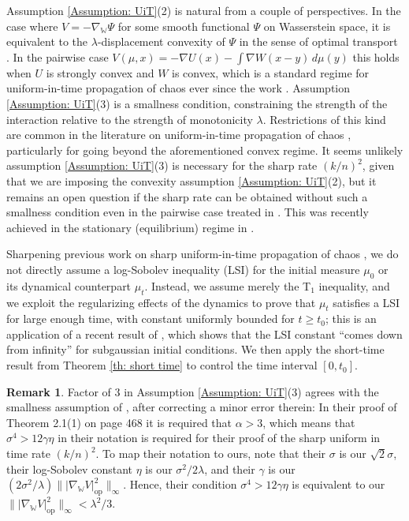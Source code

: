 \documentclass[11pt,reqno]{amsart}
\numberwithin{equation}{section}
\theoremstyle{definition}
\newtheorem{remark}[theorem]{Remark}
\newcommand{\wgrad}{\nabla_{\W}}
\newcommand{\W}{\mathbb W}
\begin{document}
Assumption \ref{Assumption: UiT}(2) is natural from a couple of perspectives. In the case where $V=-\wgrad\Psi$ for some smooth functional $\Psi$ on Wasserstein space, it is equivalent to the $\lambda$-displacement convexity of $\Psi$ in the sense of optimal transport \cite[Lemma 3.6]{GangboConvexity}. In the pairwise case $V(\mu,x)= -\nabla U(x) - \int  \nabla W(x-y)\,d\mu(y)$ this holds when $U$ is strongly convex and $W$ is convex, which is a standard regime for uniform-in-time propagation of chaos ever since the work \cite{Malrieu2001-va}. Assumption \ref{Assumption: UiT}(3) is a smallness condition, constraining the strength of the interaction relative to the strength of monotonicity $\lambda$. Restrictions of this kind are common in the literature on uniform-in-time propagation of chaos \cite{elementaryUITchaos,UiTWeakChaos,SharpChaosLacker2023}, particularly for going beyond the aforementioned convex regime. It seems unlikely assumption \ref{Assumption: UiT}(3) is necessary for the sharp rate $(k/n)^2$, given that we are imposing the convexity assumption \ref{Assumption: UiT}(2), but it remains an open question if the sharp rate can be obtained without such a smallness condition even in the pairwise case treated in \cite{SharpChaosLacker2023}. This was recently achieved in the stationary (equilibrium) regime in \cite{ren2024sizechaosgibbsmeasures}.


Sharpening previous work on sharp uniform-in-time propagation of chaos \cite{SharpChaosLacker2023,TimeUniformLSI}, we do not directly assume a log-Sobolev inequality (LSI) for the initial measure $\mu_0$ or its dynamical counterpart $\mu_t$. Instead, we assume merely the T$_1$ inequality, and we exploit the regularizing effects of the dynamics to prove that $\mu_t$ satisfies a LSI for large enough time, with constant uniformly bounded for $t \ge t_0$; this is an application of a recent result of \cite{Chen2021-ch}, which shows that the LSI constant ``comes down from infinity'' for subgaussian initial conditions. We then apply the short-time result from Theorem \ref{th: short time} to control the time interval $[0,t_0]$. 

\begin{remark}
Factor of $3$ in Assumption \ref{Assumption: UiT}(3) agrees with the smallness assumption of \cite[Theorem 2.1(1)]{SharpChaosLacker2023}, after correcting a minor error therein: In their proof of Theorem 2.1(1) on page 468 it is required that $\alpha > 3$, which means that $\sigma^4 > 12\gamma\eta$ in their notation is required for their proof of the sharp uniform in time rate $(k/n)^2$. To map their notation to ours, note that their $\sigma$ is our $\sqrt{2}\sigma$, their log-Sobolev constant $\eta$ is our $\sigma^2/2\lambda$, and their $\gamma$ is our $(2\sigma^2/\lambda)\||\wgrad V|^2_{\text{op}}\|_\infty$. Hence, their condition $\sigma^4 > 12\gamma\eta$ is equivalent to our $\||\wgrad V|^2_{\text{op}}\|_\infty < \lambda^2/3$.
\end{remark}
\end{document}
